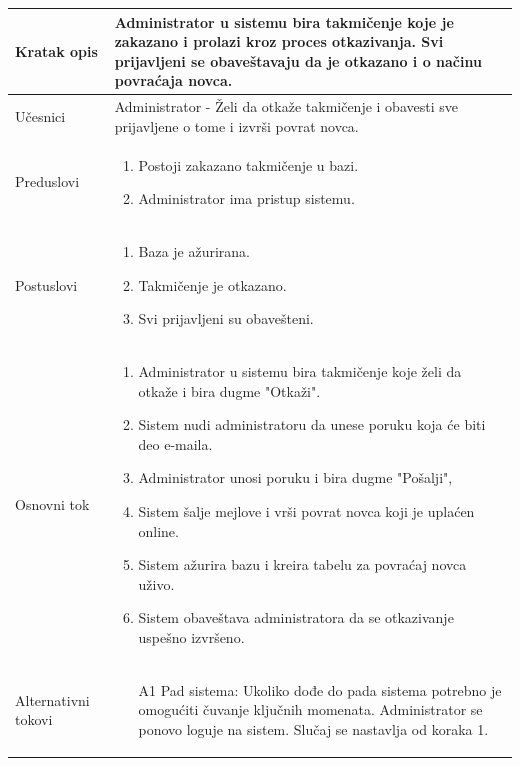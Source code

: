 \documentclass[../../main.tex]{subfiles}
\begin{document}
\begin{longtable}{| p{} | p{} |} 
\hline
    Kratak opis &  Administrator u sistemu bira takmičenje koje je zakazano i prolazi kroz proces otkazivanja. Svi prijavljeni se obaveštavaju da je otkazano i o načinu povraćaja novca.\\ 
\hline    
    Učesnici & Administrator - Želi da otkaže takmičenje i obavesti sve prijavljene o tome i izvrši povrat novca.\\
\hline
   Preduslovi & \begin{enumerate}
       \item Postoji zakazano takmičenje u bazi.
       \item Administrator ima pristup sistemu.
   \end{enumerate}\\
\hline  
    Postuslovi & \begin{enumerate}
        \item Baza je ažurirana.
        \item Takmičenje je otkazano.
        \item Svi prijavljeni su obavešteni.
    \end{enumerate}\\
\hline
    Osnovni tok & \begin{enumerate}
        \item Administrator u sistemu bira takmičenje koje želi da otkaže i bira dugme "Otkaži".
        \item Sistem nudi administratoru da unese poruku koja će biti deo e-maila.
        \item Administrator unosi poruku i bira dugme "Pošalji",
        \item Sistem šalje mejlove i vrši povrat novca koji je uplaćen online.
        \item Sistem ažurira bazu i kreira tabelu za povraćaj novca uživo.
        \item Sistem obaveštava administratora da se otkazivanje uspešno izvršeno.
    \end{enumerate}\\
\hline
    Alternativni tokovi & \begin{itemize}
        \item[A1] Pad sistema: Ukoliko dođe do pada sistema potrebno je omogućiti čuvanje ključnih momenata. Administrator se ponovo loguje na sistem. Slučaj se nastavlja od koraka 1.

\end{itemize}
\end{longtable}
\end{document}
